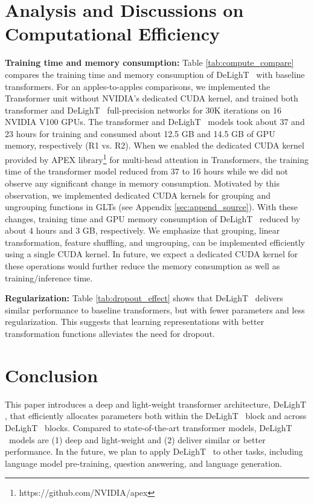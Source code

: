 \section{Analysis and Discussions on Computational Efficiency}

\noindent \textbf{Training time and memory consumption:} Table \ref{tab:compute_compare} compares the training time and memory consumption of DeLighT ~with baseline transformers. For an apples-to-apples comparisons, we implemented the Transformer unit without NVIDIA's dedicated CUDA kernel, and trained both transformer and DeLighT ~full-precision networks for 30K iterations on 16 NVIDIA V100 GPUs. The transformer and DeLighT ~models took about 37 and 23 hours for training and consumed about 12.5 GB and 14.5 GB of GPU memory, respectively (R1 vs. R2). When we enabled the dedicated CUDA kernel provided by APEX library\footnote{https://github.com/NVIDIA/apex} for multi-head attention in Transformers, the training time of the transformer model reduced from 37 to 16 hours while we did not observe any significant change in memory consumption. Motivated by this observation, we implemented dedicated CUDA kernels for grouping and ungrouping functions in GLTs (see Appendix \ref{sec:append_source}). With these changes, training time and GPU memory consumption of DeLighT ~reduced by about 4 hours and 3 GB, respectively. We emphasize that grouping, linear transformation, feature shuffling, and ungrouping, can be implemented efficiently using a single CUDA kernel. In future, we expect a dedicated CUDA kernel for these operations would further reduce the memory consumption as well as training/inference time.

\vspace{0.5mm}
\noindent \textbf{Regularization:} Table \ref{tab:dropout_effect} shows that DeLighT ~delivers similar performance to  baseline transformers, but with fewer parameters and less regularization. This suggests that learning representations with better transformation functions alleviates the need for dropout.

\section{Conclusion}
This paper introduces a deep and light-weight transformer architecture, DeLighT , that efficiently allocates parameters both within the DeLighT ~block and across DeLighT ~blocks. Compared to state-of-the-art transformer models, DeLighT ~models are (1) deep and light-weight and (2) deliver similar or better performance. In the future, we plan to apply DeLighT ~to other tasks, including language model pre-training, question answering, and language generation.

